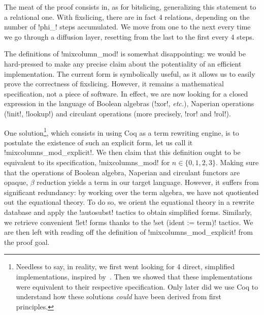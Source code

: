 \documentclass[draft,english]{jflart}
\newcommand{\etc}{\textit{etc.}}
\begin{document}
The meat of the proof consists in, as for bitslicing, generalizing
this statement to a relational one. With fixslicing, there are in fact
4 relations, depending on the number of \coqe!phi_! steps accumulated.
We move from one to the next every time we go through a diffusion
layer, resetting from the last to the first every 4 steps.



The definitions of \coqe!mixcolumn_mod! is somewhat disappointing: we
would be hard-pressed to make any precise claim about the potentiality
of an efficient implementation. The current form is symbolically
useful, as it allows us to easily prove the correctness of fixslicing.
However, it remains a mathematical specification, not a piece of
software. In effect, we are now looking for a closed expression in the
language of Boolean algebras (\coqe!xor!, \etc{}), Naperian operations
(\coqe!init!, \coqe!lookup!) and circulant operations (more precisely,
\coqe!ror! and \coqe!rol!).

One solution\footnote{Needless to say, in reality, we first went
looking for 4 direct, simplified implementations, inspired
by~\citet{adominicai:fixslicing-gift}. Then we showed that these
implementations were equivalent to their respective
specification. Only later did we use Coq to understand how these
solutions \emph{could} have been derived from first principles.},
which consists in using Coq as a term rewriting engine, is to
postulate the existence of such an explicit form, let us call it
%
\coqe!mixcolumns_mod_explicit!.
%
We then claim that this definition ought to be equivalent to its
specification, \coqe!mixcolumns_mod! for $n \in \{0, 1, 2, 3\}$.
Making sure that the operations of Boolean algebra, Naperian and
circulant functors are opaque, $\beta$ reduction yields a term in our
target language. However, it suffers from significant redundancy: by
working over the term algebra, we have not quotiented out the
equational theory. To do so, we orient the equational theory in a
rewrite database and apply the \coqe!autosubst! tactics to obtain
simplified forms. Similarly, we retrieve convenient \coqe!let! forms
thanks to the \coqe!set (ident := term)! tactics. We are then left
with reading off the definition of \coqe!mixcolumns_mod_explicit! from
the proof goal.
\end{document}
